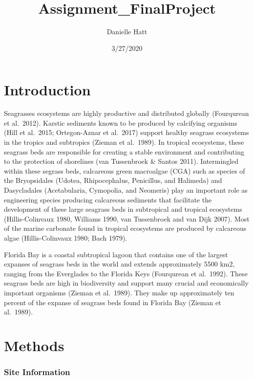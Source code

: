 \documentclass[]{article}
\title{Assignment\_FinalProject}
\author{Danielle Hatt}
\date{3/27/2020}
\begin{document}
\maketitle

\hypertarget{introduction}{%
\section{Introduction}\label{introduction}}

Seagrasses ecosystems are highly productive and distributed globally
(Fourqurean et al.~2012). Karstic sediments known to be produced by
calcifying organisms (Hill et al.~2015; Ortegon-Aznar et al.~2017)
support healthy seagrass ecosystems in the tropics and subtropics
(Zieman et al.~1989). In tropical ecosystems, these seagrass beds are
responsible for creating a stable environment and contributing to the
protection of shorelines (van Tussenbroek \& Santos 2011). Intermingled
within these segrass beds, calcareous green macroalgae (CGA) such as
species of the Bryopsidales (Udotea, Rhipocephalus, Penicillus, and
Halimeda) and Dasycladales (Acetabularia, Cymopolia, and Neomeris) play
an important role as engineering species producing calcareous sediments
that facilitate the development of these large seagrass beds in
subtropical and tropical ecosystems (Hillis-Colinvaux 1980, Williams
1990, van Tussenbroek and van Dijk 2007). Most of the marine carbonate
found in tropical ecosystems are produced by calcareous algae
(Hillis-Colinvaux 1980; Bach 1979).

Florida Bay is a coastal subtropical lagoon that contains one of the
largest expanses of seagrass beds in the world and extends approximately
5500 km2, ranging from the Everglades to the Florida Keys (Fourqurean et
al.~1992). These seagrass beds are high in biodiversity and support many
crucial and economically important organisms (Zieman et al.~1989). They
make up approximately ten percent of the expanse of seagrass beds found
in Florida Bay (Zieman et al.~1989).

\hypertarget{methods}{%
\section{Methods}\label{methods}}

\hypertarget{site-information}{%
\subsubsection{Site Information}\label{site-information}}
\end{document}
